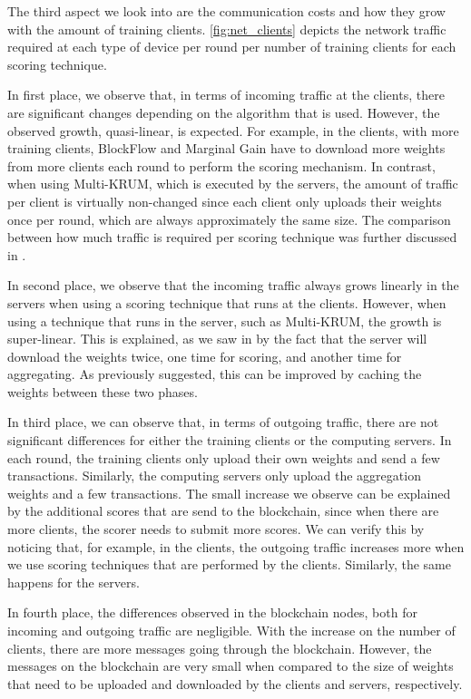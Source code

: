 The third aspect we look into are the communication costs and how they grow with the amount of training clients. \autoref{fig:net_clients} depicts the network traffic required at each type of device per round per number of training clients for each scoring technique.

In first place, we observe that, in terms of incoming traffic at the clients, there are significant changes depending on the algorithm that is used. However, the observed growth, quasi-linear, is expected. For example, in the clients, with more training clients, BlockFlow and Marginal Gain have to download more weights from more clients each round to perform the scoring mechanism. In contrast, when using Multi-KRUM, which is executed by the servers, the amount of traffic per client is virtually non-changed since each client only uploads their weights once per round, which are always approximately the same size. The comparison between how much traffic is required per scoring technique was further discussed in .

In second place, we observe that the incoming traffic always grows linearly in the servers when using a scoring technique that runs at the clients. However, when using a technique that runs in the server, such as Multi-KRUM, the growth is super-linear. This is explained, as we saw in  by the fact that the server will download the weights twice, one time for scoring, and another time for aggregating. As previously suggested, this can be improved by caching the weights between these two phases.

In third place, we can observe that, in terms of outgoing traffic, there are not significant differences for either the training clients or the computing servers. In each round, the training clients only upload their own weights and send a few transactions. Similarly, the computing servers only upload the aggregation weights and a few transactions. The small increase we observe can be explained by the additional scores that are send to the blockchain, since when there are more clients, the scorer needs to submit more scores. We can verify this by noticing that, for example, in the clients, the outgoing traffic increases more when we use scoring techniques that are performed by the clients. Similarly, the same happens for the servers.

In fourth place, the differences observed in the blockchain nodes, both for incoming and outgoing traffic are negligible. With the increase on the number of clients, there are more messages going through the blockchain. However, the messages on the blockchain are very small when compared to the size of weights that need to be uploaded and downloaded by the clients and servers, respectively. 

